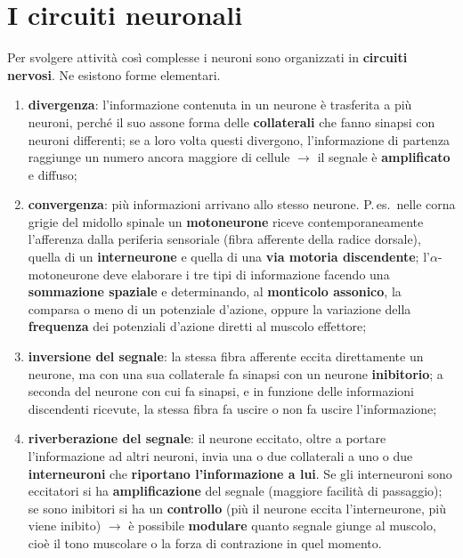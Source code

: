 \section{I circuiti neuronali}

Per svolgere attività così complesse i neuroni sono organizzati in \textbf{circuiti nervosi}. Ne
esistono forme elementari.

\begin{enumerate}
  \item \textbf{divergenza}: l'informazione contenuta in un neurone è trasferita a più neuroni,
    perché il suo assone forma delle \textbf{collaterali} che fanno sinapsi con neuroni differenti;
    se a loro volta questi divergono, l'informazione di partenza raggiunge un numero ancora
    maggiore di cellule $\rightarrow$ il segnale è \textbf{amplificato} e diffuso;
  \item \textbf{convergenza}: più informazioni arrivano allo stesso neurone. P.\,es.\ nelle corna
    grigie del midollo spinale un \textbf{motoneurone} riceve contemporaneamente l'afferenza dalla
    periferia sensoriale (fibra afferente della radice dorsale), quella di un \textbf{interneurone}
    e quella di una \textbf{via motoria discendente}; l'$\alpha$-motoneurone deve elaborare i tre
    tipi di informazione facendo una \textbf{sommazione spaziale} e determinando, al
    \textbf{monticolo assonico}, la comparsa o meno di un potenziale d'azione, oppure la variazione
    della \textbf{frequenza} dei potenziali d'azione diretti al muscolo effettore;
  \item \textbf{inversione del segnale}: la stessa fibra afferente eccita direttamente un neurone,
    ma con una sua collaterale fa sinapsi con un neurone \textbf{inibitorio}; a seconda del neurone
    con cui fa sinapsi, e in funzione delle informazioni discendenti ricevute, la stessa fibra fa
    uscire o non fa uscire l'informazione;
  \item \textbf{riverberazione del segnale}: il neurone eccitato, oltre a portare l'informazione ad
    altri neuroni, invia una o due collaterali a uno o due \textbf{interneuroni} che
    \textbf{riportano l'informazione a lui}. Se gli interneuroni sono eccitatori si ha
    \textbf{amplificazione} del segnale (maggiore facilità di passaggio); se sono inibitori si ha
    un \textbf{controllo} (più il neurone eccita l'interneurone, più viene inibito)
    $\rightarrow$ è possibile \textbf{modulare} quanto segnale giunge al muscolo, cioè il tono
    muscolare o la forza di contrazione in quel momento.
\end{enumerate}

